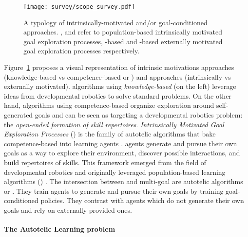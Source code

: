 \begin{figure}[!h]
\centering
\texttt{[image: survey/scope\_survey.pdf]}
\caption{A typology of intrinsically-motivated and/or goal-conditioned \rl approaches. \popimgep, \rlimgep and \rlemgep refer to population-based intrinsically motivated goal exploration processes, \rl-based \imgep and \rl-based externally motivated goal exploration processes respectively.}
\label{fig:survey_scope}
\end{figure}


Figure~\ref{fig:survey_scope} proposes a visual representation of intrinsic motivations approaches (knowledge-based \ims vs competence-based \ims or \imgeps) and \rl approaches (intrinsically vs externally motivated). \rl algorithms using \textit{knowledge-based} \ims (on the left) leverage ideas from developmental robotics to solve standard \rl problems. On the other hand, algorithms using competence-based \ims organize exploration around self-generated goals and can be seen as targeting a developmental robotics problem: the \textit{open-ended formation of skill repertoires}. \textit{Intrinsically Motivated Goal Exploration Processes} (\imgep) is the family of autotelic algorithms that bake competence-based \ims into learning agents \citep{imgep}. \imgep agents generate and pursue their own goals as a way to explore their environment, discover possible interactions, and build repertoires of skills. This framework emerged from the field of developmental robotics \citep{oudeyer2007intrinsic,baranes2009proximo,baranes2010intrinsically,rolf2010goal} and originally leveraged population-based learning algorithms (\popimgep) \citep{baranes2009r,baranes2013active,forestier2016modular,imgep}. The intersection between \imgep and multi-goal \rl are autotelic \rl algorithms or \rlimgep. They train agents to generate and pursue their own goals by training goal-conditioned policies. They contrast with \rlemgep agents which do not generate their own goals and rely on externally provided ones. 



\paragraph{The Autotelic Learning problem}

